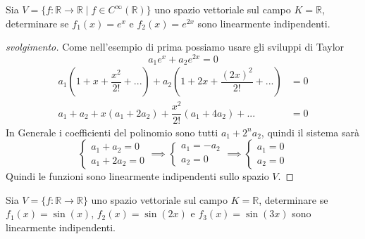\documentclass{rapport}
\begin{document}
\newpage
\begin{esercizio}{}{}
  Sia $V=\{f:\mathbb{R}\to \mathbb{R} \;|\;f \in C^{\infty}(\mathbb{R}) \}$ uno spazio vettoriale sul campo $K=\mathbb{R}$, determinare se $f_1(x)=e^{x}$ e $f_2(x)=e^{2x}$ sono linearmente indipendenti.
\end{esercizio}
\begin{proof}[svolgimento]
Come nell'esempio di prima possiamo usare gli sviluppi di Taylor
\[
a_1e^{x} + a_2e^{2x} = 0
\]
\begin{align*}
a_1\left(1+x+\dfrac{x^2}{2!}+...\right) +  a_2\left(1+2x+\dfrac{(2x)^2}{2!}+...\right) &= 0\\
a_1 + a_2 + x(a_1+2a_2) + \dfrac{x^2}{2!}\left(a_1+4a_2\right)+...&= 0
\end{align*}
 In Generale i coefficienti del polinomio sono tutti $a_1+2^na_2$, quindi il sistema sarà
 \[
 \begin{cases}
  a_1 + a_2 = 0 \\
  a_1+2a_2 = 0
 \end{cases} \implies
 \begin{cases}
  a_1  = - a_2 \\
  a_2 = 0
 \end{cases}\implies
 \begin{cases}
  a_1  = 0 \\
  a_2 = 0
 \end{cases}
 \] 
 Quindi le funzioni sono linearmente indipendenti sullo spazio $V$.
\end{proof}
\begin{esercizio}{}{}
  Sia $V=\{f:\mathbb{R}\to \mathbb{R}\}$ uno spazio vettoriale sul campo $K=\mathbb{R}$, determinare se $f_1(x)=\sin(x)$, $f_2(x)=\sin(2x)$ e $f_3(x)=\sin(3x)$ sono linearmente indipendenti.
\end{esercizio}
\end{document}
